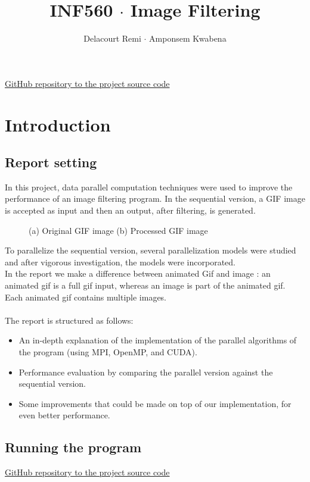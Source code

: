 \documentclass[11pt]{article}
\title{INF560 $\cdot$ Image Filtering}
\author{Delacourt Remi $\cdot$ Amponsem Kwabena}
\begin{document}
\maketitle
\begin{center}
    \href{https://github.com/Flechman/X-INF560-Project}{GitHub repository to the project source code}
\end{center}
\newpage
\tableofcontents
\newpage

\section{Introduction}
\subsection{Report setting}

In this project, data parallel computation techniques were used to improve the performance of an image filtering program. In the sequential version, a GIF image is accepted as input and then an output, after filtering, is generated.
\begin{figure}[h]
	\centering
	\caption{(a) Original GIF image (b) Processed GIF image}
	\label{fig:introduction}
\end{figure}

To parallelize the sequential version, several parallelization models were studied and after vigorous investigation, the models were incorporated. \\
In the report we make a difference between animated Gif and image : an animated gif is a full gif input, whereas an image is part of the animated gif. Each animated gif contains multiple images. \\
\\
The report is structured as follows:
\begin{itemize}
	\item An in-depth explanation of the implementation of the parallel algorithms of the program (using MPI, OpenMP, and CUDA).
	\item Performance evaluation by comparing the parallel version against the sequential version.
	\item Some improvements that could be made on top of our implementation, for even better performance.
\end{itemize}

\subsection{Running the program}
\begin{center}
    \href{https://github.com/Flechman/X-INF560-Project}{GitHub repository to the project source code}
\end{center}
\end{document}
